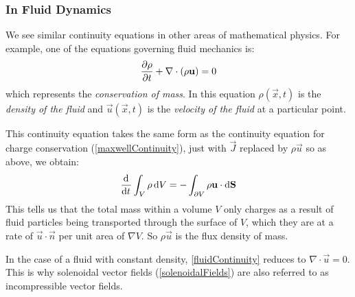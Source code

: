 \documentclass[../main.tex]{subfiles}
\begin{document}
\subsubsection{In Fluid Dynamics}
We see similar continuity equations in other areas of mathematical physics.
For example, one of the equations governing fluid mechanics is:
\begin{equation}
  \pderiv{\rho}{t} + \nabla\cdot(\rho \vec{u}) = 0 \label{fluidContinuity}
\end{equation}
which represents the \textit{conservation of mass}.
In this equation $\rho(\vec{x}, t)$ is the \textit{density of the fluid} and $\vec{u}(\vec{x}, t)$ is the \textit{velocity of the fluid} at a particular point.

This continuity equation takes the same form as the continuity equation for charge conservation (\cref{maxwellContinuity}), just with $\vec{J}$ replaced by $\rho \vec{u}$ so as above, we obtain:
\[
  \deriv{}{t}\int_{V} \rho \d{V} = - \int_{\partial V} \rho \vec{u} \cdot \d{\vec{S}}
\]
This tells us that the total mass within a volume $V$ only charges as a result of fluid particles being transported through the surface of $V$, which they are at a rate of $\vec{u} \cdot \vec{n}$ per unit area of $\nabla V$.
So $\rho \vec{u}$ is the flux density of mass.

In the case of a fluid with constant density, \cref{fluidContinuity} reduces to $\nabla \cdot \vec{u} = 0$.
This is why solenoidal vector fields (\cref{solenoidalFields}) are also referred to as incompressible vector fields.
\end{document}
